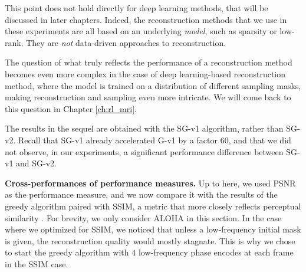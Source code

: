 \begin{remark}
    This point does not hold directly for deep learning methods, that will be discussed in later chapters. Indeed, the reconstruction methods that we use in these experiments are all based on an underlying \textit{model}, such as sparsity or low-rank. They are \textit{not} data-driven approaches to reconstruction. 

    The question of what truly reflects the performance of a reconstruction method becomes even more complex in the case of deep learning-based reconstruction method, where the model is trained on a distribution of different sampling masks, making reconstruction and sampling even more intricate. We will come back to this question in Chapter \ref{ch:rl_mri}. 
\end{remark}


\begin{remark}
    The results in the sequel are obtained with the SG-v1 algorithm, rather than SG-v2. Recall that SG-v1 already accelerated G-v1 by a factor $60$, and that we did not observe, in our experiments, a significant performance difference between SG-v1 and SG-v2\footnotemark.
\end{remark}
\FloatBarrier
\textbf{Cross-performances of performance measures.} Up to here, we used PSNR as the performance measure, and we now compare it with the results of the greedy algorithm paired with SSIM, a metric that more closely reflects perceptual similarity \citep{wang2004image}. For brevity, we only consider ALOHA in this section. In the case where we optimized for SSIM, we noticed that unless a low-frequency initial mask is given, the reconstruction quality would mostly stagnate. This is why we chose to start the greedy algorithm with $4$ low-frequency phase encodes at each frame in the SSIM case.

